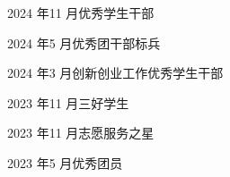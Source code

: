\documentclass[a4paper]{article}
\begin{document}
\vspace{0.7pt}
\begin{minipage}[t]{0.591\textwidth}
2024 年11 月优秀学生干部
\end{minipage}%
\begin{minipage}[t]{0.591\textwidth}
2024 年5 月优秀团干部标兵
\end{minipage}

\begin{minipage}[t]{0.591\textwidth}
2024 年3 月创新创业工作优秀学生干部
\end{minipage}%
\begin{minipage}[t]{0.591\textwidth}
2023 年11 月三好学生
\end{minipage}

\begin{minipage}[t]{0.591\textwidth}
2023 年11 月志愿服务之星
\end{minipage}%
\begin{minipage}[t]{0.591\textwidth}
2023 年5 月优秀团员
\end{minipage}
\end{document}
